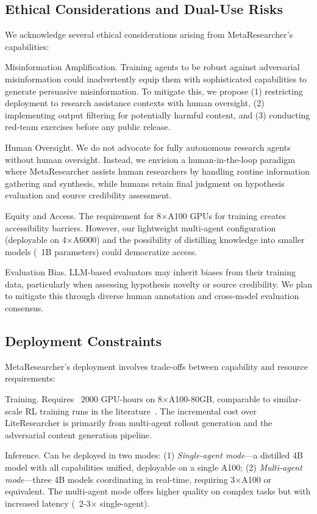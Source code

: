\documentclass[notspecified,article,accept,pdftex,moreauthors]{Definitions/mdpi}
\renewcommand{\textbf}[1]{#1}
\begin{document}
\subsection{Ethical Considerations and Dual-Use Risks}
We acknowledge several ethical considerations arising from MetaResearcher's capabilities:

\textbf{Misinformation Amplification.} Training agents to be robust against adversarial misinformation could inadvertently equip them with sophisticated capabilities to generate persuasive misinformation. To mitigate this, we propose (1) restricting deployment to research assistance contexts with human oversight, (2) implementing output filtering for potentially harmful content, and (3) conducting red-team exercises before any public release.

\textbf{Human Oversight.} We do not advocate for fully autonomous research agents without human oversight. Instead, we envision a human-in-the-loop paradigm where MetaResearcher assists human researchers by handling routine information gathering and synthesis, while humans retain final judgment on hypothesis evaluation and source credibility assessment.

\textbf{Equity and Access.} The requirement for 8$\times$A100 GPUs for training creates accessibility barriers. However, our lightweight multi-agent configuration (deployable on 4$\times$A6000) and the possibility of distilling knowledge into smaller models (~1B parameters) could democratize access.

\textbf{Evaluation Bias.} LLM-based evaluators may inherit biases from their training data, particularly when assessing hypothesis novelty or source credibility. We plan to mitigate this through diverse human annotation and cross-model evaluation consensus.

\subsection{Deployment Constraints}
MetaResearcher's deployment involves trade-offs between capability and resource requirements:

\textbf{Training.} Requires ~2000 GPU-hours on 8$\times$A100-80GB, comparable to similar-scale RL training runs in the literature~\cite{b1,b6,b7}. The incremental cost over LiteResearcher is primarily from multi-agent rollout generation and the adversarial content generation pipeline.

\textbf{Inference.} Can be deployed in two modes: (1) \textit{Single-agent mode}---a distilled 4B model with all capabilities unified, deployable on a single A100; (2) \textit{Multi-agent mode}---three 4B models coordinating in real-time, requiring 3$\times$A100 or equivalent. The multi-agent mode offers higher quality on complex tasks but with increased latency (~2-3$\times$ single-agent).
\end{document}
